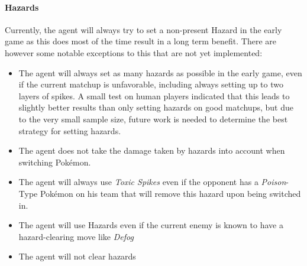 \paragraph{Hazards}
Currently, the agent will always try to set a non-present Hazard in the early game as this does most 
of the time result in a long term benefit. There are however some notable exceptions to this that 
are not yet implemented:
\begin{itemize}
  \item The agent will always set as many hazards as possible in the early game, even if the current matchup 
  is unfavorable, including always setting up to two layers of spikes. A small test on human players indicated
  that this leads to slightly better results than only setting hazards on good matchups, but due to the very
  small sample size, future work is needed to determine the best strategy for setting hazards.
  \item The agent does not take the damage taken by hazards into account when switching Pokémon. 
  \item The agent will always use \textit{Toxic Spikes} even if the opponent has a \textit{Poison}-Type
  Pokémon on his team that will remove this hazard upon being switched in.
  \item The agent will use Hazards even if the current enemy is known to have a hazard-clearing move like
  \textit{Defog} ~\autocite{Bulbapedia:Defog}
  \item The agent will not clear hazards
\end{itemize}


